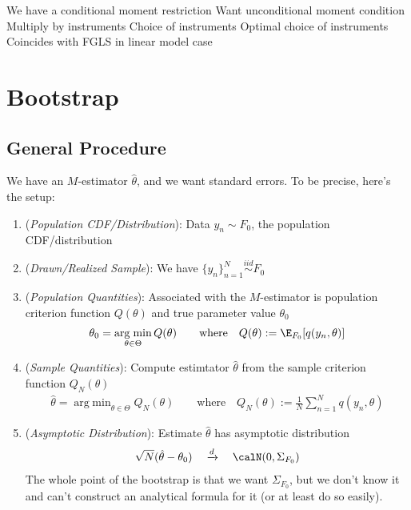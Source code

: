 \documentclass[12pt]{article}
\theoremstyle{plain}
\theoremstyle{definition}
\theoremstyle{remark}
\DeclareMathOperator*{\argmin}{arg\;min}
\newcommand{\iid}{\overset{iid}{\sim}}
\newcommand{\dto}{\xrightarrow{d}}
\newcommand{\sumnN}{\sum^N_{n=1}}
\newcommand{\nN}{_{n=1}^N}
\begin{document}
We have a conditional moment restriction
Want unconditional moment condition
Multiply by instruments
Choice of instruments
Optimal choice of instruments
Coincides with FGLS in linear model case




\clearpage
\section{Bootstrap}

\subsection{General Procedure}

We have an $M$-estimator $\hat{\theta}$, and we want standard errors.
To be precise, here's the setup:
\begin{enumerate}
  \item (\emph{Population CDF/Distribution}):
    Data $y_n\sim F_0$, the population CDF/distribution
  \item (\emph{Drawn/Realized Sample}):
    We have $\{y_n\}\nN\iid F_0$
  \item (\emph{Population Quantities}):
    Associated with the $M$-estimator is population criterion function
    $Q(\theta)$ and true parameter value $\theta_0$
    \begin{align*}
      \theta_0
      = \argmin_{\theta\in\Theta}
      Q(\theta)
      \qquad\text{where}\quad
      Q(\theta)
      :=
      \E_{F_0}[q(y_n,\theta)]
    \end{align*}
  \item (\emph{Sample Quantities}):
    Compute estimtator $\hat{\theta}$ from the sample criterion function
    $Q_N(\theta)$
    \begin{align*}
      \hat{\theta}
      = \argmin_{\theta\in\Theta}
      Q_N(\theta)
      \qquad\text{where}\quad
      Q_N(\theta)
      :=
      \frac{1}{N}
      \sumnN
      q(y_n,\theta)
    \end{align*}

  \item
    (\emph{Asymptotic Distribution}):
    Estimate $\hat{\theta}$ has asymptotic distribution
    \begin{align*}
      \sqrt{N}(\hat{\theta}-\theta_0)
      \quad\dto\quad
      \calN(0,\Sigma_{F_0})
    \end{align*}
    The whole point of the bootstrap is that we want $\Sigma_{F_0}$,
    but we don't know it and can't construct an analytical formula for
    it (or at least do so easily).
\end{enumerate}
\end{document}
